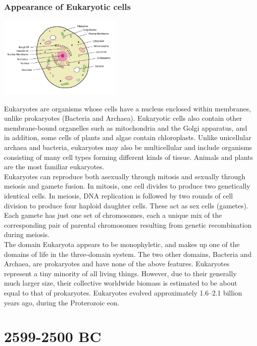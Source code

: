\documentclass[11pt]{report}
\begin{document}
\section{Appearance of Eukaryotic cells}
\vspace{2mm}\begin{center}\includegraphics[width=6cm]{./img/eukaryoticCell.jpg}\end{center}
Eukaryotes are organisms whose cells have a nucleus enclosed within membranes, unlike prokaryotes (Bacteria and Archaea). Eukaryotic cells also contain other membrane-bound organelles such as mitochondria and the Golgi apparatus, and in addition, some cells of plants and algae contain chloroplasts. Unlike unicellular archaea and bacteria, eukaryotes may also be multicellular and include organisms consisting of many cell types forming different kinds of tissue. Animals and plants are the most familiar eukaryotes.\\
Eukaryotes can reproduce both asexually through mitosis and sexually through meiosis and gamete fusion. In mitosis, one cell divides to produce two genetically identical cells. In meiosis, DNA replication is followed by two rounds of cell division to produce four haploid daughter cells. These act as sex cells (gametes). Each gamete has just one set of chromosomes, each a unique mix of the corresponding pair of parental chromosomes resulting from genetic recombination during meiosis.\\
The domain Eukaryota appears to be monophyletic, and makes up one of the domains of life in the three-domain system. The two other domains, Bacteria and Archaea, are prokaryotes and have none of the above features. Eukaryotes represent a tiny minority of all living things. However, due to their generally much larger size, their collective worldwide biomass is estimated to be about equal to that of prokaryotes. Eukaryotes evolved approximately 1.6–2.1 billion years ago, during the Proterozoic eon.


\part{2599-2500 BC}
\end{document}
